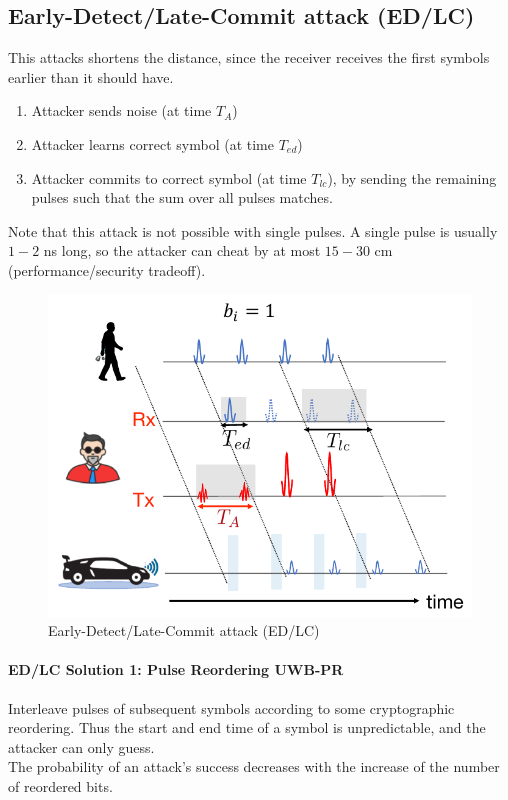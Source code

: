 \subsection{Early-Detect/Late-Commit attack (ED/LC)}
This attacks shortens the distance, since the receiver receives the first symbols earlier than it should have.

\begin{enumerate}
	\item Attacker sends noise (at time $T_A$)
	\item Attacker learns correct symbol (at time $T_{ed}$)
	\item Attacker commits to correct symbol (at time $T_{lc}$), by sending the remaining pulses such that the sum over all pulses matches.
\end{enumerate}

Note that this attack is not possible with single pulses.
A single pulse is usually $1-2$ ns long, so the attacker can cheat by at most $15-30$ cm (performance/security tradeoff).

\begin{figure}[h]
	\centering
	\includegraphics[scale=0.3]{images/5-edlc.png}
	\caption{Early-Detect/Late-Commit attack (ED/LC)}%
	\label{fig:edlc}
\end{figure}

\paragraph{ED/LC Solution 1: Pulse Reordering UWB-PR}
Interleave pulses of subsequent symbols according to some cryptographic reordering.
Thus the start and end time of a symbol is unpredictable, and the attacker can only guess.
\\
The probability of an attack's success decreases with the increase of the number of reordered bits.

